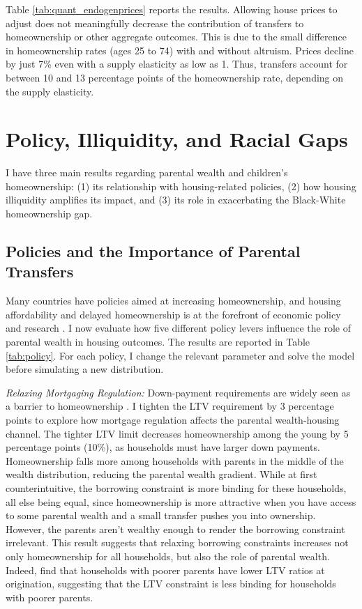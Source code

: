 \documentclass[12pt]{article}
\begin{document}
Table \ref{tab:quant_endogenprices} reports the results. Allowing house prices to adjust does not meaningfully decrease the contribution of transfers to homeownership or other aggregate outcomes. This is due to the small difference in homeownership rates (ages 25 to 74) with and without altruism. Prices decline by just 7\% even with a supply elasticity as low as 1. Thus, transfers account for between 10 and 13 percentage points of the homeownership rate, depending on the supply elasticity.

\section{Policy, Illiquidity, and Racial Gaps}\label{sec:pol}
I have three main results regarding parental wealth and children's homeownership: (1) its relationship with housing-related policies, (2) how housing illiquidity amplifies its impact, and (3) its role in exacerbating the Black-White homeownership gap.

\subsection{Policies and the Importance of Parental Transfers}
Many countries have policies aimed at increasing homeownership, and housing affordability and delayed homeownership is at the forefront of economic policy and research \citep[see e.g.,][]{Mabille2020}. I now evaluate how five different policy levers influence the role of parental wealth in housing outcomes. The results are reported in Table \ref{tab:policy}. For each policy, I change the relevant parameter and solve the model before simulating a new distribution.

\textit{Relaxing Mortgaging Regulation:} Down-payment requirements are widely seen as a barrier to homeownership \citep[e.g.,][]{Lee2018,Guiso2002}. I tighten the LTV requirement by 3 percentage points to explore how mortgage regulation affects the parental wealth-housing channel. The tighter LTV limit decreases homeownership among the young by 5 percentage points (10\%), as households must have larger down payments. Homeownership falls more among households with parents in the middle of the wealth distribution, reducing the parental wealth gradient. While at first counterintuitive, the borrowing constraint is more binding for these households, all else being equal, since homeownership is more attractive when you have access to some parental wealth and a small transfer pushes you into ownership. However, the parents aren't wealthy enough to render the borrowing constraint irrelevant. This result suggests that relaxing borrowing constraints increases not only homeownership for all households, but also the role of parental wealth. Indeed, \cite{wold2024housing} find that households with poorer parents have lower LTV ratios at origination, suggesting that the LTV constraint is less binding for households with poorer parents.
\end{document}
